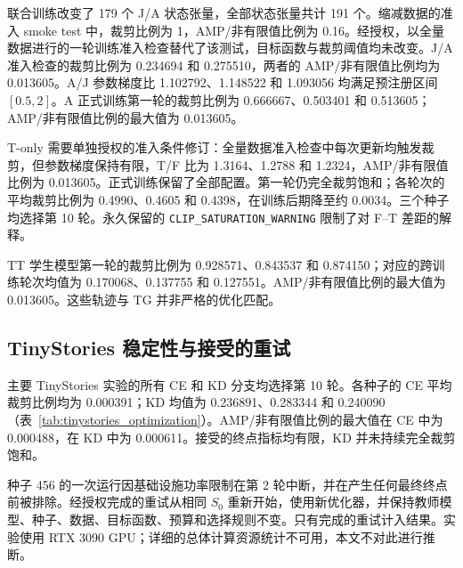 联合训练改变了 179 个 J/A 状态张量，全部状态张量共计 191 个。缩减数据的准入 smoke test 中，裁剪比例为 1，AMP/非有限值比例为 0.16。经授权，以全量数据进行的一轮训练准入检查替代了该测试，目标函数与裁剪阈值均未改变。J/A 准入检查的裁剪比例为 0.234694 和 0.275510，两者的 AMP/非有限值比例均为 0.013605。A/J 参数梯度比 1.102792、1.148522 和 1.093056 均满足预注册区间 $[0.5,2]$。A 正式训练第一轮的裁剪比例为 0.666667、0.503401 和 0.513605；AMP/非有限值比例的最大值为 0.013605。

T-only 需要单独授权的准入条件修订：全量数据准入检查中每次更新均触发裁剪，但参数梯度保持有限，T/F 比为 1.3164、1.2788 和 1.2324，AMP/非有限值比例为 0.013605。正式训练保留了全部配置。第一轮仍完全裁剪饱和；各轮次的平均裁剪比例为 0.4990、0.4605 和 0.4398，在训练后期降至约 0.0034。三个种子均选择第 10 轮。永久保留的 \texttt{CLIP\_SATURATION\_WARNING} 限制了对 F--T 差距的解释。

TT 学生模型第一轮的裁剪比例为 0.928571、0.843537 和 0.874150；对应的跨训练轮次均值为 0.170068、0.137755 和 0.127551。AMP/非有限值比例的最大值为 0.013605。这些轨迹与 TG 并非严格的优化匹配。

\subsection{TinyStories 稳定性与接受的重试}
主要 TinyStories 实验的所有 CE 和 KD 分支均选择第 10 轮。各种子的 CE 平均裁剪比例均为 0.000391；KD 均值为 0.236891、0.283344 和 0.240090（表~\ref{tab:tinystories_optimization}）。AMP/非有限值比例的最大值在 CE 中为 0.000488，在 KD 中为 0.000611。接受的终点指标均有限，KD 并未持续完全裁剪饱和。

种子 456 的一次运行因基础设施功率限制在第 2 轮中断，并在产生任何最终终点前被排除。经授权完成的重试从相同 $S_0$ 重新开始，使用新优化器，并保持教师模型、种子、数据、目标函数、预算和选择规则不变。只有完成的重试计入结果。实验使用 RTX 3090 GPU；详细的总体计算资源统计不可用，本文不对此进行推断。

